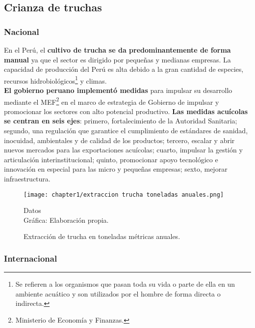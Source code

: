 \subsection{Crianza de truchas}

\subsubsection{Nacional}
En el Perú, el \textbf{cultivo de trucha se da predominantemente de forma manual} ya que el sector es dirigido por pequeñas y medianas empresas. La capacidad de producción del Perú es alta debido a la gran cantidad de especies, recursos hidrobiológicos\footnote{Se refieren a los organismos que pasan toda su vida o parte de ella en un ambiente acuático y son utilizados por el hombre de forma directa o indirecta.\cite{MINAGRI2011}} y climas.\\
\textbf{El gobierno peruano implementó medidas} para impulsar su desarrollo mediante el MEF\footnote{Ministerio de Economía y Finanzas.}  en el marco de estrategia de Gobierno de impulsar y promocionar los sectores con alto potencial productivo. \textbf{Las medidas acuícolas se centran en seis ejes}: primero, fortalecimiento de la Autoridad Sanitaria; segundo, una regulación que garantice el cumplimiento de estándares de sanidad, inocuidad, ambientales y de calidad de los productos; tercero, escalar y abrir nuevos mercados para las exportaciones acuícolas; cuarto, impulsar la gestión y articulación interinstitucional; quinto, promocionar apoyo tecnológico e innovación en especial para las micro y pequeñas empresas; sexto, mejorar infraestructura. \cite{Andina2019}\\

\begin{figure}[H]
	\centering
	\texttt{[image: chapter1/extraccion trucha toneladas anuales.png]}
	\caption{Extracción de trucha en toneladas métricas anuales.}
	 Datos \cite{MinisteriodelaProducciondelPeru2018}\\
	  Gráfica: Elaboración propia.
	\label{fig:Extracción de trucha en toneladas métricas anuales}
\end{figure}

\subsubsection{Internacional}

